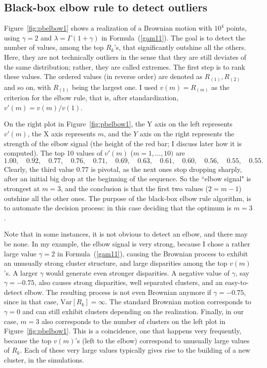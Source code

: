 \documentclass[oneside,10pt]{book}
\begin{document}

\subsection{Black-box elbow rule to detect outliers}\label{elbtr45}

\noindent Figure~\ref{fig:pbelbow1} shows a realization of a \textcolor{index}{Brownian motion} with $10^4$ points, using $\gamma=2$ and
$\lambda=\Gamma(1+\gamma)$ in Formula~(\ref{gam11}).  The goal is to detect the number of values, among the top $R_k$'s, that significantly outshine all the others. Here, they are not technically outliers in the sense that they are still deviates of the same distribution; rather, they are called extremes.
The first step is to rank these values. The ordered values (in reverse order) are denoted as $R_{(1)},R_{(2)}$ and so on, with $R_{(1)}$ being the largest one. I
used $v(m)=R_{(m)}$ as the criterion for the elbow rule, that is, after standardization, $v'(m)=v(m)/v(1)$.

On the right plot in Figure~\ref{fig:pbelbow1}, the Y axis on the left represents $v'(m)$, the X axis represents $m$, and the $Y$ axis on the right represents the strength of the elbow signal (the height of the red bar; I discuss later how it is computed). The top 10 values of $v'(m)$ ($m=1,\dots, 10)$ are
$$1.00, \quad
0.92, \quad
0.77,\quad
0.76,\quad
0.71,\quad
0.69,\quad
0.63,\quad
0.61,\quad
0.60,\quad
0.56, \quad
0.55,\quad
0.55.$$
Clearly, the third value $0.77$ is pivotal, as the next ones stop dropping sharply, after an initial big drop at the beginning of the sequence. So the ``elbow signal" is strongest at $m=3$, and the conclusion is that the first two values ($2=m-1$) outshine all the other ones. The purpose of the black-box elbow rule algorithm, is to automate the decision process: in this case deciding that the optimum is $m=3$.

Note that in some instances, it is not obvious to detect an elbow, and there may be none. In my example, the elbow signal is very strong, because I chose a rather large value $\gamma=2$ in Formula~(\ref{gam11}), causing the Brownian process to exhibit an unusually strong cluster structure, and large disparities among the top $v(m)$'s.
A larger $\gamma$ would generate even stronger disparities. A negative value of $\gamma$, say $\gamma=-0.75$, also causes strong disparities, well separated clusters, and an easy-to-detect elbow. The resulting process is not even Brownian anymore if $\gamma=-0.75$, since in that case, $\mbox{Var}[R_k]=\infty$. The
standard  Brownian motion corresponds to $\gamma=0$ and can still exhibit clusters depending on the realization. Finally, in our case, $m=3$ also corresponds to the number of clusters on the left plot in Figure~\ref{fig:pbelbow1}. This is a coincidence, one that happens very frequently, because the top $v(m)$'s (left to the elbow) correspond to unusually large values of $R_k$. Each of these very large values typically gives
 rise to the building of a new cluster, in the simulations.
\end{document}
